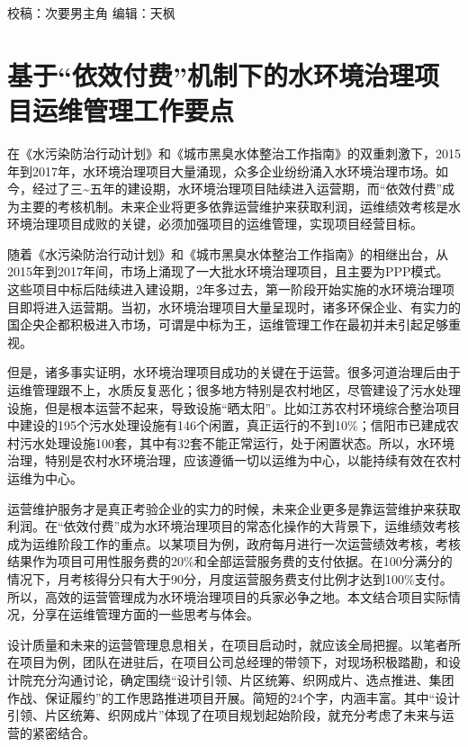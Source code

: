 \documentclass[
]{book}
\begin{document}
校稿：次要男主角
编辑：天枫

\hypertarget{ux57faux4e8eux4f9dux6548ux4ed8ux8d39ux673aux5236ux4e0bux7684ux6c34ux73afux5883ux6cbbux7406ux9879ux76eeux8fd0ux7ef4ux7ba1ux7406ux5de5ux4f5cux8981ux70b9}{%
\section{基于``依效付费''机制下的水环境治理项目运维管理工作要点}\label{ux57faux4e8eux4f9dux6548ux4ed8ux8d39ux673aux5236ux4e0bux7684ux6c34ux73afux5883ux6cbbux7406ux9879ux76eeux8fd0ux7ef4ux7ba1ux7406ux5de5ux4f5cux8981ux70b9}}

在《水污染防治行动计划》和《城市黑臭水体整治工作指南》的双重刺激下，2015年到2017年，水环境治理项目大量涌现，众多企业纷纷涌入水环境治理市场。如今，经过了三\textasciitilde 五年的建设期，水环境治理项目陆续进入运营期，而``依效付费''成为主要的考核机制。未来企业将更多依靠运营维护来获取利润，运维绩效考核是水环境治理项目成败的关键，必须加强项目的运维管理，实现项目经营目标。

随着《水污染防治行动计划》和《城市黑臭水体整治工作指南》的相继出台，从2015年到2017年间，市场上涌现了一大批水环境治理项目，且主要为PPP模式。这些项目中标后陆续进入建设期，2年多过去，第一阶段开始实施的水环境治理项目即将进入运营期。当初，水环境治理项目大量呈现时，诸多环保企业、有实力的国企央企都积极进入市场，可谓是中标为王，运维管理工作在最初并未引起足够重视。

但是，诸多事实证明，水环境治理项目成功的关键在于运营。很多河道治理后由于运维管理跟不上，水质反复恶化；很多地方特别是农村地区，尽管建设了污水处理设施，但是根本运营不起来，导致设施``晒太阳''。比如江苏农村环境综合整治项目中建设的195个污水处理设施有146个闲置，真正运行的不到10\%；信阳市已建成农村污水处理设施100套，其中有32套不能正常运行，处于闲置状态。所以，水环境治理，特别是农村水环境治理，应该遵循一切以运维为中心，以能持续有效在农村运维为中心。

运营维护服务才是真正考验企业的实力的时候，未来企业更多是靠运营维护来获取利润。在``依效付费''成为水环境治理项目的常态化操作的大背景下，运维绩效考核成为运维阶段工作的重点。以某项目为例，政府每月进行一次运营绩效考核，考核结果作为项目可用性服务费的20\%和全部运营服务费的支付依据。在100分满分的情况下，月考核得分只有大于90分，月度运营服务费支付比例才达到100\%支付。所以，高效的运营管理成为水环境治理项目的兵家必争之地。本文结合项目实际情况，分享在运维管理方面的一些思考与体会。

设计质量和未来的运营管理息息相关，在项目启动时，就应该全局把握。以笔者所在项目为例，团队在进驻后，在项目公司总经理的带领下，对现场积极踏勘，和设计院充分沟通讨论，确定围绕``设计引领、片区统筹、织网成片、选点推进、集团作战、保证履约''的工作思路推进项目开展。简短的24个字，内涵丰富。其中``设计引领、片区统筹、织网成片''体现了在项目规划起始阶段，就充分考虑了未来与运营的紧密结合。
\end{document}
